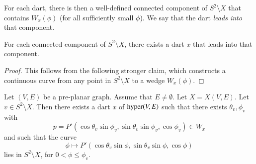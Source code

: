 \begin{definition} For each dart, there is then a well-defined connected
component of $S^2\setminus X$ that contains $W_x(\phi)$ (for all
sufficiently small $\phi$). We say that the dart {\it leads into}
that component.
\end{definition}

\begin{lemma}
For each connected component of $S^2\setminus X$, there exists a
dart $x$ that leads into that component.
\end{lemma}

\begin{proof} This follows from the following stronger claim, which constructs
a continuous curve from any point in $S^2\setminus X$ to a wedge
$W_x(\phi)$.
\end{proof}

\begin{lemma}  Let $(V,E)$ be a pre-planar graph.  Assume that $E\ne\emptyset$.
Let $X=X(V,E)$.
Let $v\in S^2\setminus X$.  Then there exists a dart $x$ of
${\operatorname{hyper}}(V,E)$ such that there exists $\theta_v,\phi_v$ with
    $$p = P'(\cos\theta_v\sin\phi_v,\sin\theta_v\sin\phi_v,\cos\phi_v)\in
    W_x$$
and such that the curve
    $$\phi\mapsto
    P'(\cos\theta_v\sin\phi,\sin\theta_v\sin\phi,\cos\phi)
    $$
lies in $S^2\setminus X$,  for $0 < \phi \le \phi_v$.
\end{lemma}

